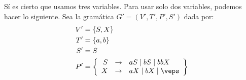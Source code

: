 \begin{ejercicio}
\begin{enumerate}
        Sí es cierto que usamos tres variables. Para usar solo dos variables,
        podemos hacer lo siguiente.
        Sea la gramática $G'=\left(V',T',P',S'\right)$ dada por:
        \begin{align*}
            V' &= \{S, X\} \\
            T' &= \{a,b\} \\
            S' &= S \\
            P' &= \left\{
                \begin{array}{rcl}
                    S &\rightarrow & aS \mid bS \mid bbX \\
                    X &\rightarrow & aX \mid bX \mid \veps
                \end{array}
            \right\}
        \end{align*}
    \end{enumerate}
\end{ejercicio}

